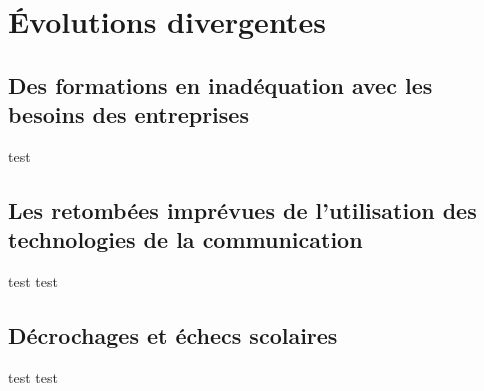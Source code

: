 \section{Évolutions divergentes}

\subsection{Des formations en inadéquation avec les besoins des entreprises}

\begin{frame}{test}
\end{frame}

\subsection{Les retombées imprévues de l'utilisation des technologies de la communication}

\begin{frame}{test}
test
\end{frame}

\subsection{Décrochages et échecs scolaires}

\begin{frame}{test}
test
\end{frame}